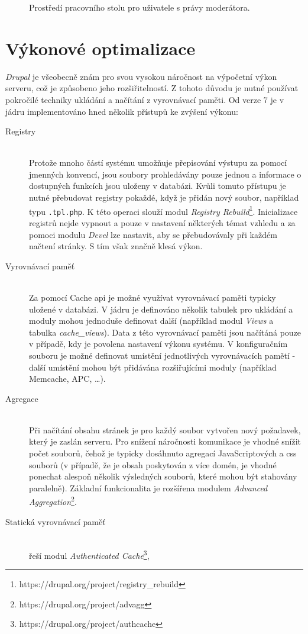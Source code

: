 \begin{figure}[htp]
  \caption{Prostředí pracovního stolu pro uživatele s právy moderátora.}
  \label{fig:workbench}
\end{figure}  

\section{Výkonové optimalizace}
\emph{Drupal} je všeobecně znám pro svou vysokou náročnost na výpočetní výkon serveru, což je způsobeno jeho rozšiřitelností. Z tohoto důvodu je nutné používat pokročilé techniky ukládání a načítání z vyrovnávací paměti\cite{high-performance-drupal}. Od verze 7 je v jádru implementováno hned několik přístupů ke zvýšení výkonu:

\begin{description}
  \item[Registry] \hfill \\
  Protože mnoho částí systému umožňuje přepisování výstupu za pomocí jmenných konvencí, jsou soubory prohledávány pouze jednou a informace o dostupných funkcích jsou uloženy v databázi. Kvůli tomuto přístupu je nutné přebudovat registry pokaždé, když je přidán nový soubor, například typu \texttt{.tpl.php}. K této operaci slouží modul \emph{Registry Rebuild}\footnote{https://drupal.org/project/registry\_rebuild}. Inicializace registrů nejde vypnout a pouze v nastavení některých témat vzhledu a za pomoci modulu \emph{Devel} lze nastavit, aby se přebudovávaly při každém načtení stránky. S tím však značně klesá výkon.
  \item[Vyrovnávací paměť] \hfill \\
  Za pomocí Cache \gls{api} je možné využívat vyrovnávací paměti typicky uložené v databázi. V jádru je definováno několik tabulek pro ukládání a moduly mohou jednoduše definovat další (například modul \emph{Views} a tabulka \emph{cache\_views}). Data z této vyrovnávací paměti jsou načítáná pouze v případě, kdy je povolena nastavení výkonu systému. V konfiguračním souboru je možné definovat umístění jednotlivých vyrovnávacích pamětí - další umístění mohou být přidávána rozšiřujícími moduly (například Memcache, APC, \dots).
  \item[Agregace] \hfill \\
  Při načítání obsahu stránek je pro každý soubor vytvořen nový požadavek, který je zaslán serveru. Pro snížení náročnosti komunikace je vhodné snížit počet souborů, čehož je typicky dosáhnuto agregací JavaScriptových a \gls{css} souborů (v případě, že je obsah poskytován z více domén, je vhodné ponechat alespoň několik výsledných souborů, které mohou být stahovány paralelně)\cite{website:drupal:optimizing}. Základní funkcionalita je rozšířena modulem \emph{Advanced Aggregation}\footnote{https://drupal.org/project/advagg}.
  \item[Statická vyrovnávací paměť] \hfill \\
 řeší modul \emph{Authenticated Cache}\footnote{https://drupal.org/project/authcache}, 
\end{description}
